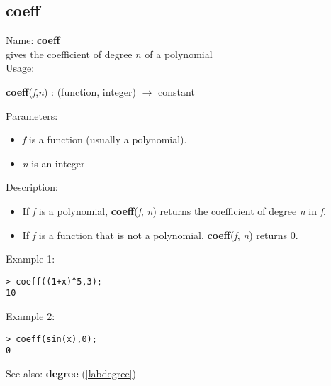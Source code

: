 \subsection{coeff}
\label{labcoeff}
\noindent Name: \textbf{coeff}\\
gives the coefficient of degree $n$ of a polynomial\\
\noindent Usage: 
\begin{center}
\textbf{coeff}(\emph{f},\emph{n}) : (\textsf{function}, \textsf{integer}) $\rightarrow$ \textsf{constant}\\
\end{center}
Parameters: 
\begin{itemize}
\item \emph{f} is a function (usually a polynomial).
\item \emph{n} is an integer
\end{itemize}
\noindent Description: \begin{itemize}

\item If \emph{f} is a polynomial, \textbf{coeff}(\emph{f}, \emph{n}) returns the coefficient of
   degree \emph{n} in \emph{f}.

\item If \emph{f} is a function that is not a polynomial, \textbf{coeff}(\emph{f}, \emph{n}) returns 0.
\end{itemize}
\noindent Example 1: 
\begin{center}\begin{minipage}{15cm}\begin{Verbatim}[frame=single]
> coeff((1+x)^5,3);
10
\end{Verbatim}
\end{minipage}\end{center}
\noindent Example 2: 
\begin{center}\begin{minipage}{15cm}\begin{Verbatim}[frame=single]
> coeff(sin(x),0);
0
\end{Verbatim}
\end{minipage}\end{center}
See also: \textbf{degree} (\ref{labdegree})
